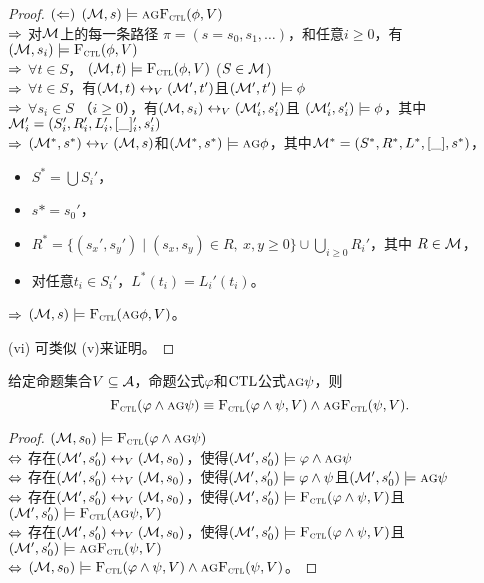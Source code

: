 \begin{proof}
	$(\Leftarrow)$ $({\cal M}, s) \models \textsc{a} \textsc{g} {\textsc{F}_{\textsc{ctl}}}(\phi, V)$\\
	$\Rightarrow$ 对${\cal M}$上的每一条路径 $\pi=(s=s_0, s_1, \dots)$，和任意$i \geq 0$，有$({\cal M},s_i) \models {\textsc{F}_{\textsc{ctl}}}(\phi, V)$  \\ 
	$\Rightarrow$ $\forall t \in S$， $({\cal M},t) \models {\textsc{F}_{\textsc{ctl}}}(\phi, V)$ \hfill ($S \in {\cal M}$)\\
	$\Rightarrow$ $\forall t \in S$，有$({\cal M},t) \leftrightarrow_V ({\cal M}',t')$且$({\cal M}',t') \models \phi$\\
	$\Rightarrow$ $\forall s_i \in S$ （$i \geq 0$），有$({\cal M},s_i) \leftrightarrow_V ({\cal M}_i',s_i')$且 $({\cal M}_i',s_i') \models \phi$，其中${\cal M}_i' = (S_i',R_i', L_i', [\_]_i',s_i')$\\
	$\Rightarrow$ $({\cal M}^*,s^*) \leftrightarrow_V ({\cal M},s)$和$({\cal M}^*,s^*) \models \textsc{a} \textsc{g} \phi$，其中${\cal M}^*= (S^*, R^*,L^*, [\_], s^*)$，
	\begin{itemize}
		\item $S^*= \bigcup S_i'$， %
		\item $s* = s_0'$，
		\item $R^* = \{(s_x', s_y') \mid (s_x, s_y) \in R,\ x, y \geq 0\} \cup \bigcup_{i \geq 0} R_i'$，其中 $R\in {\cal M}$，
		\item 对任意$t_i\in S_i'$，$L^*(t_i) = L_i'(t_i)$。
	\end{itemize}
	$\Rightarrow$ $({\cal M},s) \models {\textsc{F}_{\textsc{ctl}}}(\textsc{a} \textsc{g} \phi, V)$。
	
	(vi) 可类似 (v)来证明。
\end{proof}


\begin{corollary}
	给定命题集合$V\subseteq {\cal A}$，命题公式$\varphi$和$\textrm{CTL}$公式$\textsc{a}\textsc{g} \psi$，则
	$${\textsc{F}_{\textsc{ctl}}}(\varphi \wedge \textsc{a}\textsc{g} \psi)\equiv {\textsc{F}_{\textsc{ctl}}}(\varphi \wedge \psi, V) \wedge \textsc{a}\textsc{g}{\textsc{F}_{\textsc{ctl}}}(\psi, V).$$
\end{corollary}
\begin{proof}
	 $({\cal M},s_0) \models {\textsc{F}_{\textsc{ctl}}}(\varphi \wedge \textsc{a}\textsc{g} \psi)$\\
	$\Leftrightarrow$ 存在$({\cal M}',s_0')  \leftrightarrow_V ({\cal M},s_0)$，使得$({\cal M}',s_0') \models \varphi \wedge \textsc{a}\textsc{g} \psi$\\
	$\Leftrightarrow$ 存在$({\cal M}',s_0')  \leftrightarrow_V ({\cal M},s_0)$，使得$({\cal M}',s_0') \models \varphi \wedge \psi$且$({\cal M}',s_0') \models \textsc{a}\textsc{g} \psi$\\
	$\Leftrightarrow$ 存在$({\cal M}',s_0')  \leftrightarrow_V ({\cal M},s_0)$，使得$({\cal M}',s_0') \models {\textsc{F}_{\textsc{ctl}}}(\varphi \wedge \psi,V)$且$({\cal M}',s_0') \models {\textsc{F}_{\textsc{ctl}}}(\textsc{a}\textsc{g} \psi,V)$\\
	$\Leftrightarrow$ 存在$({\cal M}',s_0')  \leftrightarrow_V ({\cal M},s_0)$，使得$({\cal M}',s_0') \models {\textsc{F}_{\textsc{ctl}}}(\varphi \wedge \psi,V)$且$({\cal M}',s_0') \models \textsc{a}\textsc{g}{\textsc{F}_{\textsc{ctl}}}( \psi,V)$\\
	$\Leftrightarrow$ $({\cal M},s_0) \models {\textsc{F}_{\textsc{ctl}}}(\varphi \wedge \psi,V)\wedge \textsc{a}\textsc{g}{\textsc{F}_{\textsc{ctl}}}( \psi,V)$。
\end{proof}
